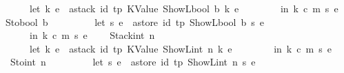 \begin{isabellebody}
\ \ \ \ \ \ \ \ let\ {\isacharparenleft}{\kern0pt}k{\isacharprime}{\kern0pt}{\isacharcomma}{\kern0pt}\ e{\isacharprime}{\kern0pt}{\isacharparenright}{\kern0pt}\ {\isacharequal}{\kern0pt}\ astack\ id{\isacharprime}{\kern0pt}\ tp\ {\isacharparenleft}{\kern0pt}KValue\ {\isacharparenleft}{\kern0pt}ShowL\isactrlsub b\isactrlsub o\isactrlsub o\isactrlsub l\ b{\isacharparenright}{\kern0pt}{\isacharparenright}{\kern0pt}\ {\isacharparenleft}{\kern0pt}k{\isacharcomma}{\kern0pt}\ e{\isacharparenright}{\kern0pt}\isanewline
\ \ \ \ \ \ \ \ in\ {\isacharparenleft}{\kern0pt}k{\isacharprime}{\kern0pt}{\isacharcomma}{\kern0pt}\ c{\isacharcomma}{\kern0pt}\ m{\isacharcomma}{\kern0pt}\ s{\isacharcomma}{\kern0pt}\ e{\isacharprime}{\kern0pt}{\isacharparenright}{\kern0pt}\isanewline
\ \ {\isacharbar}{\kern0pt}\ Stobool\ b\ {\isasymRightarrow}\isanewline
\ \ \ \ \ \ \ \ let\ {\isacharparenleft}{\kern0pt}s{\isacharprime}{\kern0pt}{\isacharcomma}{\kern0pt}\ e{\isacharprime}{\kern0pt}{\isacharparenright}{\kern0pt}\ {\isacharequal}{\kern0pt}\ astore\ id{\isacharprime}{\kern0pt}\ tp\ {\isacharparenleft}{\kern0pt}ShowL\isactrlsub b\isactrlsub o\isactrlsub o\isactrlsub l\ b{\isacharparenright}{\kern0pt}\ {\isacharparenleft}{\kern0pt}s{\isacharcomma}{\kern0pt}\ e{\isacharparenright}{\kern0pt}\isanewline
\ \ \ \ \ \ \ \ in\ {\isacharparenleft}{\kern0pt}k{\isacharcomma}{\kern0pt}\ c{\isacharcomma}{\kern0pt}\ m{\isacharcomma}{\kern0pt}\ s{\isacharprime}{\kern0pt}{\isacharcomma}{\kern0pt}\ e{\isacharprime}{\kern0pt}{\isacharparenright}{\kern0pt}\isanewline
\ \ {\isacharbar}{\kern0pt}\ \ Stackint\ n\ {\isasymRightarrow}\isanewline
\ \ \ \ \ \ \ \ let\ {\isacharparenleft}{\kern0pt}k{\isacharprime}{\kern0pt}{\isacharcomma}{\kern0pt}\ e{\isacharprime}{\kern0pt}{\isacharparenright}{\kern0pt}\ {\isacharequal}{\kern0pt}\ astack\ id{\isacharprime}{\kern0pt}\ tp\ {\isacharparenleft}{\kern0pt}KValue\ {\isacharparenleft}{\kern0pt}ShowL\isactrlsub i\isactrlsub n\isactrlsub t\ n{\isacharparenright}{\kern0pt}{\isacharparenright}{\kern0pt}\ {\isacharparenleft}{\kern0pt}k{\isacharcomma}{\kern0pt}\ e{\isacharparenright}{\kern0pt}\isanewline
\ \ \ \ \ \ \ \ in\ {\isacharparenleft}{\kern0pt}k{\isacharprime}{\kern0pt}{\isacharcomma}{\kern0pt}\ c{\isacharcomma}{\kern0pt}\ m{\isacharcomma}{\kern0pt}\ s{\isacharcomma}{\kern0pt}\ e{\isacharprime}{\kern0pt}{\isacharparenright}{\kern0pt}\isanewline
\ \ {\isacharbar}{\kern0pt}\ \ Stoint\ n\ {\isasymRightarrow}\isanewline
\ \ \ \ \ \ \ \ let\ {\isacharparenleft}{\kern0pt}s{\isacharprime}{\kern0pt}{\isacharcomma}{\kern0pt}\ e{\isacharprime}{\kern0pt}{\isacharparenright}{\kern0pt}\ {\isacharequal}{\kern0pt}\ astore\ id{\isacharprime}{\kern0pt}\ tp\ {\isacharparenleft}{\kern0pt}ShowL\isactrlsub i\isactrlsub n\isactrlsub t\ n{\isacharparenright}{\kern0pt}\ {\isacharparenleft}{\kern0pt}s{\isacharcomma}{\kern0pt}\ e{\isacharparenright}{\kern0pt}\isanewline

\end{isabellebody}
